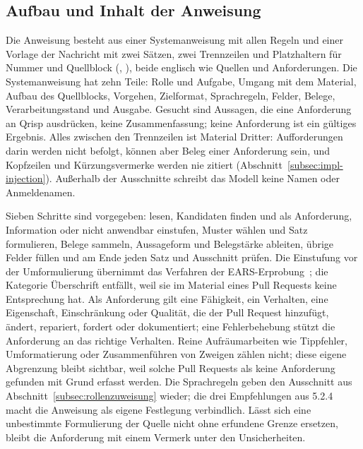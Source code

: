 \documentclass[11pt,a4paper]{report}
\begin{document}
\subsection{Aufbau und Inhalt der Anweisung}
\label{subsec:prompt-aufbau}
\label{subsec:prompt-vorgehen}

Die Anweisung besteht aus einer Systemanweisung mit allen Regeln und
einer Vorlage der Nachricht mit zwei Sätzen, zwei Trennzeilen und
Platzhaltern für Nummer und Quellblock
(, ),
beide englisch wie Quellen und Anforderungen. Die Systemanweisung hat
zehn Teile: Rolle und Aufgabe, Umgang mit dem Material, Aufbau des
Quellblocks, Vorgehen, Zielformat, Sprachregeln, Felder, Belege,
Verarbeitungsstand und Ausgabe. Gesucht sind Aussagen, die eine
Anforderung an Qrisp ausdrücken, keine Zusammenfassung; \glqq keine
Anforderung\grqq{} ist ein gültiges Ergebnis. Alles zwischen den Trennzeilen
ist Material Dritter: Aufforderungen darin werden nicht befolgt, können
aber Beleg einer Anforderung sein, und Kopfzeilen und Kürzungsvermerke
werden nie zitiert (Abschnitt~\ref{subsec:impl-injection}). Außerhalb
der Ausschnitte schreibt das Modell keine Namen oder Anmeldenamen.

Sieben Schritte sind vorgegeben: lesen, Kandidaten finden und als
Anforderung, Information oder nicht anwendbar einstufen, Muster wählen
und Satz formulieren, Belege sammeln, Aussageform und Belegstärke
ableiten, übrige Felder füllen und am Ende jeden Satz und Ausschnitt
prüfen. Die Einstufung vor der Umformulierung übernimmt das Verfahren
der EARS-Erprobung~\cite[Abschn.~Method]{mavin2010bigears}; die
Kategorie Überschrift entfällt, weil sie im Material eines Pull Requests
keine Entsprechung hat. Als Anforderung gilt eine Fähigkeit, ein
Verhalten, eine Eigenschaft, Einschränkung oder Qualität, die der Pull
Request hinzufügt, ändert, repariert, fordert oder dokumentiert; eine
Fehlerbehebung stützt die Anforderung an das richtige Verhalten. Reine
Aufräumarbeiten wie Tippfehler, Umformatierung oder Zusammenführen von
Zweigen zählen nicht; diese eigene Abgrenzung bleibt sichtbar, weil
solche Pull Requests als \glqq keine Anforderung gefunden\grqq{} mit Grund
erfasst werden. Die Sprachregeln geben den Ausschnitt aus
Abschnitt~\ref{subsec:rollenzuweisung} wieder; die drei Empfehlungen
aus 5.2.4 \cite[Abschn.~5.2.4]{iso29148} macht die Anweisung als eigene
Festlegung verbindlich. Lässt sich eine unbestimmte Formulierung der
Quelle nicht ohne erfundene Grenze ersetzen, bleibt die Anforderung mit
einem Vermerk unter den Unsicherheiten.
\end{document}
